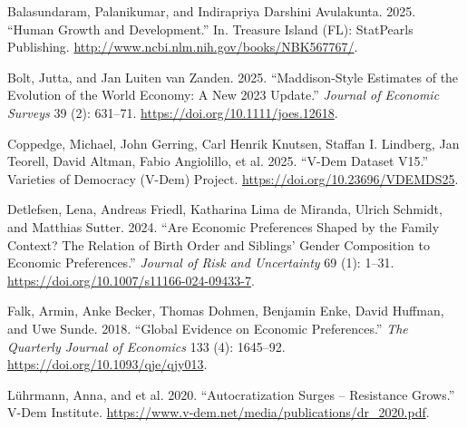 \documentclass[
  letterpaper,
  DIV=11,
  numbers=noendperiod]{scrartcl}
\newlength{\cslhangindent}
\newlength{\cslentryspacingunit} %
\newenvironment{CSLReferences}[2] %
 {%
  \setlength{\parindent}{0pt}
  \ifodd #1
  \let\oldpar\par
  \def\par{\hangindent=\cslhangindent\oldpar}
  \fi
  \setlength{\parskip}{#2\cslentryspacingunit}
 }%
 {}
\begin{document}
\hypertarget{refs}{}
\begin{CSLReferences}{1}{0}
\leavevmode{}%
Balasundaram, Palanikumar, and Indirapriya Darshini Avulakunta. 2025.
{``Human Growth and Development.''} In. Treasure Island (FL): StatPearls
Publishing. \url{http://www.ncbi.nlm.nih.gov/books/NBK567767/}.

\leavevmode{}%
Bolt, Jutta, and Jan Luiten van Zanden. 2025. {``Maddison-Style
Estimates of the Evolution of the World Economy: A New 2023 Update.''}
\emph{Journal of Economic Surveys} 39 (2): 631--71.
\url{https://doi.org/10.1111/joes.12618}.

\leavevmode{}%
Coppedge, Michael, John Gerring, Carl Henrik Knutsen, Staffan I.
Lindberg, Jan Teorell, David Altman, Fabio Angiolillo, et al. 2025.
{``V-Dem Dataset V15.''} Varieties of Democracy (V-Dem) Project.
\url{https://doi.org/10.23696/VDEMDS25}.

\leavevmode{}%
Detlefsen, Lena, Andreas Friedl, Katharina Lima de Miranda, Ulrich
Schmidt, and Matthias Sutter. 2024. {``Are Economic Preferences Shaped
by the Family Context? The Relation of Birth Order and Siblings' Gender
Composition to Economic Preferences.''} \emph{Journal of Risk and
Uncertainty} 69 (1): 1--31.
\url{https://doi.org/10.1007/s11166-024-09433-7}.

\leavevmode{}%
Falk, Armin, Anke Becker, Thomas Dohmen, Benjamin Enke, David Huffman,
and Uwe Sunde. 2018. {``Global Evidence on Economic Preferences.''}
\emph{The Quarterly Journal of Economics} 133 (4): 1645--92.
\url{https://doi.org/10.1093/qje/qjy013}.

\leavevmode{}%
Lührmann, Anna, and et al. 2020. {``Autocratization Surges -- Resistance
Grows.''} V-Dem Institute.
\url{https://www.v-dem.net/media/publications/dr_2020.pdf}.

\end{CSLReferences}
\end{document}
